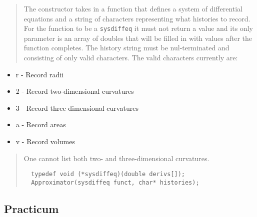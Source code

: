 \documentclass[10pt]{article}%
\begin{document}
\begin{quotation} The constructor takes in a function that defines a system of differential equations and a string of characters representing what histories to record. For the function to be a \texttt{sysdiffeq} it must not return a value and its only parameter is an array of doubles that will be filled in with values after the function completes. The history string must be nul-terminated and consisting of only valid characters. The valid characters currently are:\end{quotation}
\begin{itemize}
\item  r - Record radii
\item  2 - Record two-dimensional curvatures
\item  3 - Record three-dimensional curvatures
\item  a - Record areas
\item  v - Record volumes
\end{itemize}
\begin{quotation} One cannot list both two- and three-dimensional curvatures.{\small{\begin{verbatim} 
  typedef void (*sysdiffeq)(double derivs[]);
  Approximator(sysdiffeq funct, char* histories);
  \end{verbatim}
}}
\end{quotation}
\subsection*{Practicum}
\end{document}
